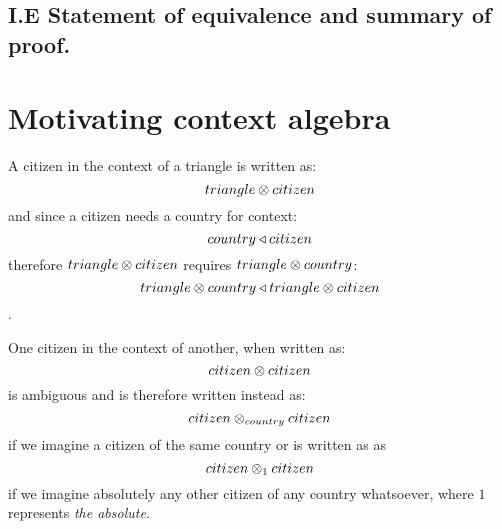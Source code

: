 \documentclass[10pt,a4paper]{scrartcl}
\begin{document}
\subsection{I.E Statement of equivalence and summary of proof.}

\section{Motivating context algebra}
A citizen in the context of a triangle is written as:
$$
triangle \otimes citizen
$$
and since a citizen needs a country for context:
$$
country \triangleleft citizen
$$
 therefore $triangle \otimes citizen$ requires $triangle \otimes country$:
$$ triangle \otimes country \triangleleft triangle \otimes citizen$$.



One citizen in the context of another, when written as:
$$citizen \otimes citizen$$
is ambiguous and is therefore written instead as:
$$citizen \otimes_{country} citizen$$
if we imagine a citizen of the same country or is written as as
$$citizen \otimes_1 citizen$$
if we imagine absolutely any other citizen of any country whatsoever, 
where $1$ represents \textit{the absolute}. 
\end{document}
